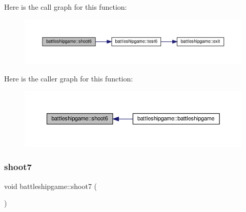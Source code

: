 Here is the call graph for this function\+:
\nopagebreak
\begin{figure}[H]
\begin{center}
\leavevmode
\includegraphics[width=350pt]{classbattleshipgame_a1af239789255b2d3c6b33789ccffae35_cgraph}
\end{center}
\end{figure}
Here is the caller graph for this function\+:
\nopagebreak
\begin{figure}[H]
\begin{center}
\leavevmode
\includegraphics[width=350pt]{classbattleshipgame_a1af239789255b2d3c6b33789ccffae35_icgraph}
\end{center}
\end{figure}
\mbox{\label{classbattleshipgame_a56ca4e048cb8e5d66719ceca1b556d76}} 
\subsubsection{\texorpdfstring{shoot7}{shoot7}}
{\footnotesize\ttfamily void battleshipgame\+::shoot7 (\begin{DoxyParamCaption}{ }\end{DoxyParamCaption})\hspace{0.3cm}{\ttfamily [slot]}}


